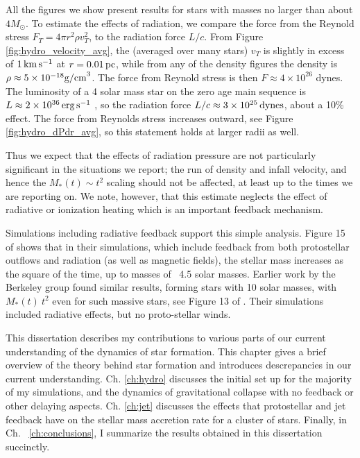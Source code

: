 \documentclass[../dissertation.tex]{subfiles}
\begin{document}
All the figures we show present results for stars with masses no larger than about $4 M_\odot$. To estimate the effects of radiation, we compare the force from the Reynold stress $F_T=4\pi r^2 \rho v_T^2$, to the radiation force $L/c$. 
From Figure \ref{fig:hydro_velocity_avg}, the (averaged over many stars) $v_T$ is slightly in excess of $1\,\rm km\,s^{-1}$ at $r=0.01\,\rm pc$, while from any of the density figures the density is $\rho\approx5\times10^{-18} {\rm g/cm}^3$. The force from Reynold stress is then $F\approx4\times 10^{26}$ dynes. The luminosity of a 4 solar mass star on the zero age main sequence is $L\approx 2\times10^{36}\,\rm erg\, s^{-1}$ \citep{1992A&AS...96..269S}, so the radiation force $L/c \approx 3\times10^{25}\,{\rm dynes}$, about a 10\% effect.  The force from Reynolds stress increases outward, see Figure \ref{fig:hydro_dPdr_avg}, so this statement holds at larger radii as well. 

Thus we expect that the effects of radiation pressure are not particularly significant in the situations we report;  the run of density and infall velocity, and hence the $M_*(t)\sim t^2$ scaling should not be affected, at least up to the times we are reporting on.  We note, however, that this estimate neglects the effect of radiative or ionization heating which is an important feedback mechanism.

Simulations including radiative feedback support this simple analysis. Figure 15 of  \citet{2014MNRAS.439.3420M} shows that in their simulations, which include feedback from both protostellar outflows and radiation (as well as magnetic fields), the stellar mass increases as the square of the time, up to masses of ~4.5 solar masses. Earlier work by the Berkeley group found similar results, forming stars with 10 solar masses, with $M_*(t)~ t^2$ even for such massive stars, see Figure 13 of \citet{2012ApJ...754...71K}. Their simulations included radiative effects, but no proto-stellar winds. 




This dissertation describes my contributions to various parts of our current understanding of the dynamics of star formation. 
This chapter gives a brief overview of the theory behind star formation and introduces descrepancies in our current understanding. 
Ch. \ref{ch:hydro} discusses the initial set up for the majority of my simulations, and the dynamics of gravitational collapse with no feedback or other delaying aspects.
Ch. \ref{ch:jet} discusses the effects that protostellar and jet feedback have on the stellar mass accretion rate for a cluster of stars.
Finally, in Ch. ~\ref{ch:conclusions}, I summarize the results obtained in this dissertation succinctly.
\end{document}
